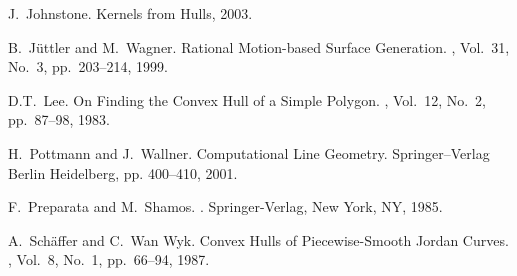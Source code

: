 \documentclass{elsart}
\begin{document}
\begin{thebibliography}{}
J.~Johnstone.  Kernels from Hulls, 2003.

B.~J\"uttler and M.~Wagner.
\newblock Rational Motion-based Surface Generation.
,
Vol.~31, No.~3, pp.~203--214, 1999.

D.T.~Lee.
\newblock On Finding the Convex Hull of a Simple Polygon.
,
Vol.~12, No.~2, pp.~87--98, 1983.

H.~Pottmann and J.~Wallner.
\newblock Computational Line Geometry.
\newblock Springer--Verlag Berlin Heidelberg, pp. 400--410, 2001.

F.~Preparata and M.~Shamos.
.
\newblock Springer-Verlag, New York, NY, 1985.

A.~Sch\"affer and C.~Wan Wyk.
\newblock Convex Hulls of Piecewise-Smooth Jordan Curves.
, Vol.~8, No.~1, pp.~66--94, 1987.

\end{thebibliography}

\end{document}
